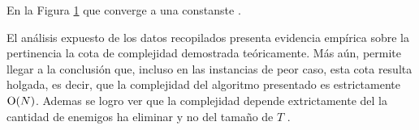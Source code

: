 	\begin{figure}[H]
		\centering
		\caption{}
		\label{fig:exp2:part_tiempo_base_var_T}
	\end{figure}

	En la Figura \ref{fig:exp2:part_tiempo_base_var_T} que converge a una constanste .

	 El análisis expuesto de los datos recopilados presenta evidencia empírica sobre la pertinencia la cota de complejidad demostrada teóricamente. Más aún, permite llegar a la conclusión que, incluso en las instancias de peor caso, esta cota resulta holgada, es decir, que la complejidad del algoritmo presentado es estrictamente $\operatorname{O}(N)$. Ademas se logro ver que la complejidad depende extrictamente del la cantidad de enemigos ha eliminar y no del tamaño de $T$ .



